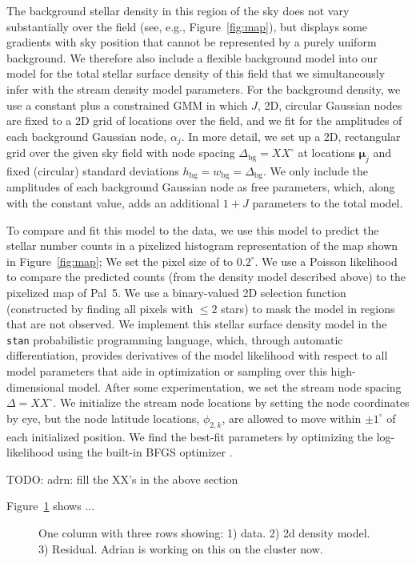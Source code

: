 \documentclass[twocolumn]{aastex62}
\newcommand{\bs}[1]{\boldsymbol{#1}}
\newcommand{\todo}[1]{{\color{red} TODO: #1}}
\begin{document}
The background stellar density in this region of the sky does not vary substantially over the field (see, e.g., Figure~\ref{fig:map}), but displays some gradients with sky position that cannot be represented by a purely uniform background.
We therefore also include a flexible background model into our model for the total stellar surface density of this field that we simultaneously infer with the stream density model parameters.
For the background density, we use a constant plus a constrained GMM in which $J$, 2D, circular Gaussian nodes are fixed to a 2D grid of locations over the field, and we fit for the amplitudes of each background Gaussian node, $\alpha_j$.
In more detail, we set up a 2D, rectangular grid over the given sky field with node spacing $\Delta_{\textrm{bg}} = XX^\circ$ at locations $\bs{\mu}_j$ and fixed (circular) standard deviations $h_{\textrm{bg}} = w_{\textrm{bg}} = \Delta_{\textrm{bg}}$.
We only include the amplitudes of each background Gaussian node as free parameters, which, along with the constant value, adds an additional $1+J$ parameters to the total model.

To compare and fit this model to the data, we use this model to predict the stellar number counts in a pixelized histogram representation of the map shown in Figure~\ref{fig:map}; We set the pixel size of to $0.2^\circ$.
We use a Poisson likelihood to compare the predicted counts (from the density model described above) to the pixelized map of Pal~5.
We use a binary-valued 2D selection function (constructed by finding all pixels with $\leq 2$ stars) to mask the model in regions that are not observed.
We implement this stellar surface density model in the \texttt{stan} \citep{stan} probabilistic programming language, which, through automatic differentiation, provides derivatives of the model likelihood with respect to all model parameters that aide in optimization or sampling over this high-dimensional model.
After some experimentation, we set the stream node spacing $\Delta = XX^\circ$.
We initialize the stream node locations by setting the node coordinates by eye, but the node latitude locations, $\phi_{2, k}$, are allowed to move within $\pm 1^\circ$ of each initialized position.
We find the best-fit parameters by optimizing the log-likelihood using the built-in BFGS optimizer \citep{Press:2007}.

\todo{adrn: fill the XX's in the above section}

Figure~\ref{fig:density-model} shows ...


\begin{figure}
\caption{One column with three rows showing: 1) data. 2) 2d density model. 3) Residual. Adrian is working on this on the cluster now. 
}
\label{fig:density-model}
\end{figure}
\end{document}
